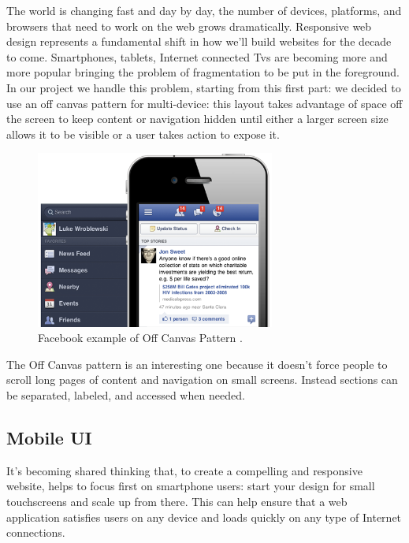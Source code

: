 \documentclass[a4paper,13pt]{report}
\begin{document}
The world is changing fast and day by day, the number of devices, platforms, and browsers that need to work on the web grows dramatically. Responsive web design represents a fundamental shift in how we'll build websites for the decade to come.
Smartphones, tablets, Internet connected Tvs are becoming more and more popular bringing the problem of fragmentation to be put in the foreground.
In our project we handle this problem, starting from this first part: we decided to use an off canvas pattern for multi-device: this layout takes advantage of space off the screen to keep content or navigation hidden until either a larger screen size allows it to be visible or a user takes action to expose it.
\\[0.2cm]
\begin{figure}[H]
  \caption{Facebook example of Off Canvas Pattern .}
  \centering
    \includegraphics[width=0.7\textwidth]{pics/UISketches/offCanvas}
\end{figure}

The Off Canvas pattern is an interesting one because it doesn't force people to scroll long pages of content and navigation on small screens. Instead sections can be separated, labeled, and accessed when needed.


\subsection {Mobile UI}
It's becoming shared thinking that, to create a compelling and responsive website,  helps to focus first on smartphone users: start your design for small touchscreens and scale up from there. This can help ensure that a web application satisfies users on any device and loads quickly on any type of Internet connections.

\end{document}
